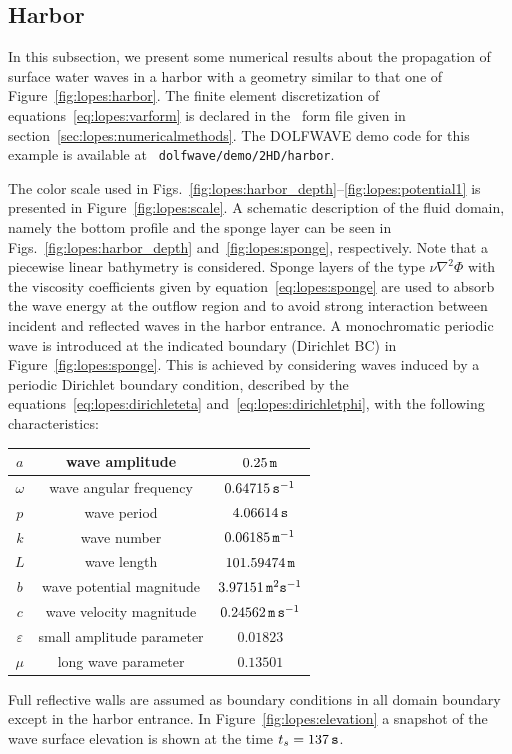 \subsection{Harbor}
In this subsection, we present some numerical results about
the propagation of surface water waves in a harbor with a
geometry similar to that one of Figure~\ref{fig:lopes:harbor}.
The finite element discretization of
equations~\eqref{eq:lopes:varform} is declared in the
\ufl\ form file given in
section~\ref{sec:lopes:numericalmethods}.  The DOLFWAVE demo
code for this example is available at {\tt
  dolfwave/demo/2HD/harbor}.

The color scale used in
Figs.~\ref{fig:lopes:harbor_depth}--\ref{fig:lopes:potential1}
is presented in Figure~\ref{fig:lopes:scale}.  A schematic
description of the fluid domain, namely the bottom profile
and the sponge layer can be seen in
Figs.~\ref{fig:lopes:harbor_depth}
and~\ref{fig:lopes:sponge}, respectively.  Note that a
piecewise linear bathymetry is considered.  Sponge layers of
the type $\nu\nabla^2\Phi$ with the viscosity coefficients
given by equation~\eqref{eq:lopes:sponge} are used to absorb
the wave energy at the outflow region and to avoid strong
interaction between incident and reflected waves in the
harbor entrance.  A monochromatic periodic wave is
introduced at the indicated boundary (Dirichlet BC) in
Figure~\ref{fig:lopes:sponge}.  This is achieved by
considering waves induced by a periodic Dirichlet boundary
condition, described by the
equations~\eqref{eq:lopes:dirichleteta}
and~\eqref{eq:lopes:dirichletphi}, with the following
characteristics:
\smallskip
\begin{center}
\renewcommand{\arraystretch}{1.3}
\begin{tabular}{|c|c|c|}
\hline $a$ & wave amplitude & $0.25 \,{\tt m}$\\ \hline
$\omega$ & wave angular frequency & $0.64715 \,{\tt
  s}^{-1}$\\ \hline $p$ & wave period & $4.06614 \,{\tt
  s}$\\ \hline $k$ & wave number & $0.06185 \,{\tt
  m}^{-1}$\\ \hline $L$ & wave length & $101.59474 \,{\tt
  m}$\\ \hline $b$ & wave potential magnitude& $3.97151
\,{\tt m}^2{\tt s}^{-1}$\\ \hline $c$ & wave velocity
magnitude& $0.24562 \,{\tt m\, s}^{-1}$ \\ \hline
$\varepsilon$& small amplitude parameter &
$0.01823$\\ \hline $\mu$ & long wave parameter &
$0.13501$\\ \hline
\end{tabular}
\end{center}
\smallskip
Full reflective walls are assumed as boundary conditions in
all domain boundary except in the harbor entrance.  In
Figure~\ref{fig:lopes:elevation} a snapshot of the wave
surface elevation is shown at the time $t_s=137\,{\tt s}$.

